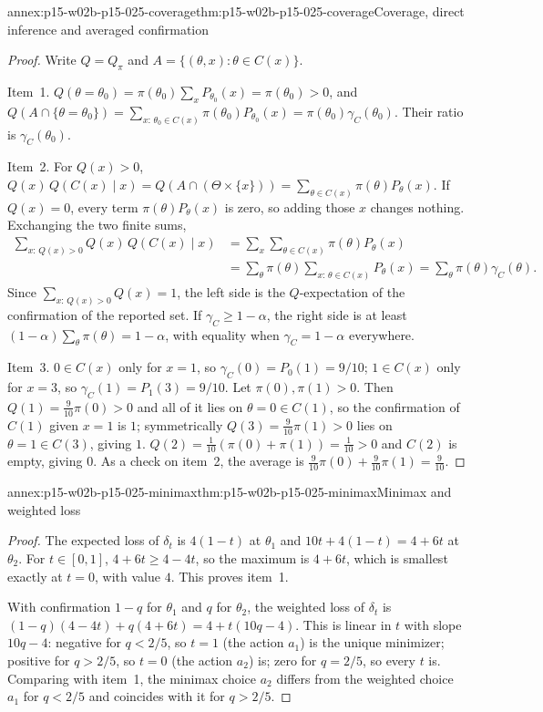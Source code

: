 \begin{annexitem}{annex:p15-w02b-p15-025-coverage}{thm:p15-w02b-p15-025-coverage}{Coverage, direct inference and averaged confirmation}
\begin{proof}
Write \(Q=Q_\pi\) and \(A=\{(\theta,x):\theta\in C(x)\}\).

Item~1. \(Q(\theta=\theta_0)=\pi(\theta_0)\sum_xP_{\theta_0}(x)=\pi(\theta_0)>0\),
and
\(Q(A\cap\{\theta=\theta_0\})=\sum_{x:\,\theta_0\in C(x)}\pi(\theta_0)P_{\theta_0}(x)
=\pi(\theta_0)\gamma_C(\theta_0)\). Their ratio is \(\gamma_C(\theta_0)\).

Item~2. For \(Q(x)>0\),
\(Q(x)\,Q(C(x)\mid x)=Q(A\cap(\Theta\times\{x\}))=\sum_{\theta\in C(x)}\pi(\theta)P_\theta(x)\).
If \(Q(x)=0\), every term \(\pi(\theta)P_\theta(x)\) is zero, so adding
those \(x\) changes nothing. Exchanging the two finite sums,
\[
 \begin{aligned}
 \sum_{x:\,Q(x)>0}Q(x)\,Q(C(x)\mid x)
 &=\sum_x\sum_{\theta\in C(x)}\pi(\theta)P_\theta(x)\\
 &=\sum_\theta\pi(\theta)\sum_{x:\,\theta\in C(x)}P_\theta(x)
 =\sum_\theta\pi(\theta)\gamma_C(\theta).
 \end{aligned}
\]
Since \(\sum_{x:\,Q(x)>0}Q(x)=1\), the left side is the
\(Q\)-expectation of the confirmation of the reported set. If
\(\gamma_C\ge1-\alpha\), the right side is at least
\((1-\alpha)\sum_\theta\pi(\theta)=1-\alpha\), with equality when
\(\gamma_C=1-\alpha\) everywhere.

Item~3. \(0\in C(x)\) only for \(x=1\), so
\(\gamma_C(0)=P_0(1)=9/10\); \(1\in C(x)\) only for \(x=3\), so
\(\gamma_C(1)=P_1(3)=9/10\). Let \(\pi(0),\pi(1)>0\). Then
\(Q(1)=\tfrac9{10}\pi(0)>0\) and all of it lies on \(\theta=0\in C(1)\),
so the confirmation of \(C(1)\) given \(x=1\) is \(1\); symmetrically
\(Q(3)=\tfrac9{10}\pi(1)>0\) lies on \(\theta=1\in C(3)\), giving \(1\).
\(Q(2)=\tfrac1{10}(\pi(0)+\pi(1))=\tfrac1{10}>0\) and \(C(2)\) is empty,
giving \(0\). As a check on item~2, the average is
\(\tfrac9{10}\pi(0)+\tfrac9{10}\pi(1)=\tfrac9{10}\).
\end{proof}
\end{annexitem}

\begin{annexitem}{annex:p15-w02b-p15-025-minimax}{thm:p15-w02b-p15-025-minimax}{Minimax and weighted loss}
\begin{proof}
The expected loss of \(\delta_t\) is \(4(1-t)\) at \(\theta_1\) and
\(10t+4(1-t)=4+6t\) at \(\theta_2\). For \(t\in[0,1]\),
\(4+6t\ge4-4t\), so the maximum is \(4+6t\), which is smallest exactly
at \(t=0\), with value \(4\). This proves item~1.

With confirmation \(1-q\) for \(\theta_1\) and \(q\) for \(\theta_2\),
the weighted loss of \(\delta_t\) is
\((1-q)(4-4t)+q(4+6t)=4+t(10q-4)\). This is linear in \(t\) with slope
\(10q-4\): negative for \(q<2/5\), so \(t=1\) (the action \(a_1\)) is
the unique minimizer; positive for \(q>2/5\), so \(t=0\) (the action
\(a_2\)) is; zero for \(q=2/5\), so every \(t\) is. Comparing with
item~1, the minimax choice \(a_2\) differs from the weighted choice
\(a_1\) for \(q<2/5\) and coincides with it for \(q>2/5\).
\end{proof}
\end{annexitem}
